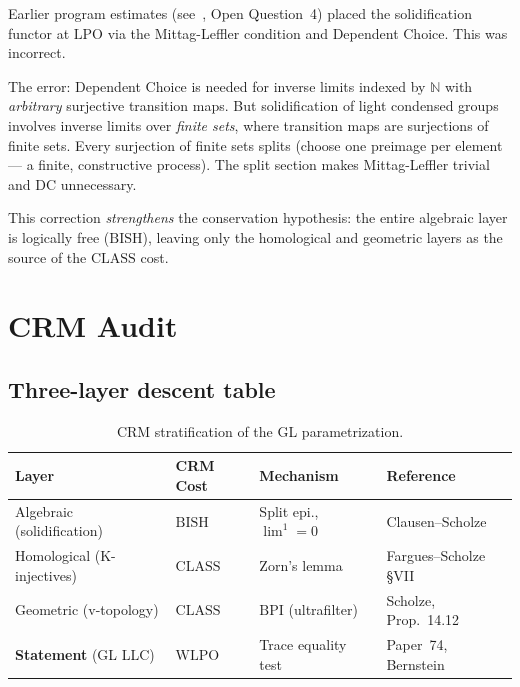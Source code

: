 \documentclass[12pt, a4paper]{article}
\theoremstyle{plain}
\theoremstyle{definition}
\theoremstyle{remark}
\newcommand{\BISH}{\mathrm{BISH}}
\newcommand{\WLPO}{\mathrm{WLPO}}
\newcommand{\LPO}{\mathrm{LPO}}
\newcommand{\CLASS}{\mathrm{CLASS}}
\newcommand{\BPI}{\mathrm{BPI}}
\newcommand{\DC}{\mathrm{DC}}
\begin{document}
Earlier program estimates (see~\cite{roadmap}, Open Question~4)
placed the solidification functor at $\LPO$ via the Mittag-Leffler
condition and Dependent Choice.  This was incorrect.

The error: Dependent Choice is needed for inverse limits indexed by
$\mathbb{N}$ with \emph{arbitrary} surjective transition maps.  But
solidification of light condensed groups involves inverse limits
over \emph{finite sets}, where transition maps are surjections of
finite sets.  Every surjection of finite sets splits (choose one
preimage per element --- a finite, constructive process).  The
split section makes Mittag-Leffler trivial and $\DC$ unnecessary.

This correction \emph{strengthens} the conservation hypothesis:
the entire algebraic layer is logically free ($\BISH$), leaving
only the homological and geometric layers as the source of
the $\CLASS$ cost.


\section{CRM Audit}\label{sec:audit}

\subsection{Three-layer descent table}

\begin{table}[h]
\centering
\begin{tabular}{llll}
\toprule
\textbf{Layer} & \textbf{CRM Cost} & \textbf{Mechanism} & \textbf{Reference} \\
\midrule
Algebraic (solidification) & $\BISH$ & Split epi., $\lim^1 = 0$
  & Clausen--Scholze \\
Homological (K-injectives) & $\CLASS$ & Zorn's lemma
  & Fargues--Scholze \S VII \\
Geometric (v-topology)     & $\CLASS$ & $\BPI$ (ultrafilter)
  & Scholze, Prop.~14.12 \\
\midrule
\textbf{Statement} (GL LLC) & $\WLPO$ & Trace equality test
  & Paper~74, Bernstein \\
\bottomrule
\end{tabular}
\caption{CRM stratification of the GL parametrization.}
\label{tab:descent}
\end{table}
\end{document}
